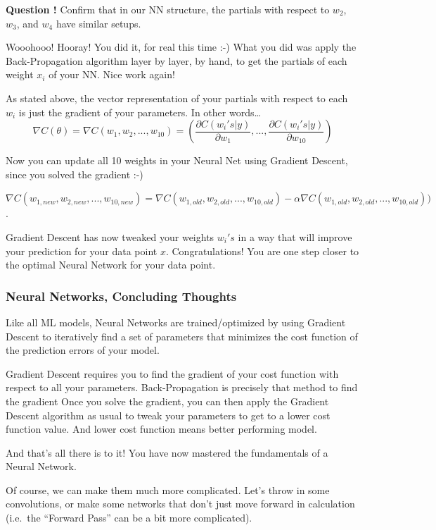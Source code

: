 \documentclass[
]{article}
\begin{document}
\textbf{Question !} Confirm that in our NN structure, the partials with
respect to \(w_2\), \(w_3\), and \(w_4\) have similar setups.

Wooohooo! Hooray! You did it, for real this time :-) What you did was
apply the Back-Propagation algorithm layer by layer, by hand, to get the
partials of each weight \(x_i\) of your NN. Nice work again!

As stated above, the vector representation of your partials with respect
to each \(w_i\) is just the gradient of your parameters. In other
words\ldots{} \[
\nabla C(\theta) = \nabla C(w_{1}, w_{2},..., w_{10}) = (\frac{\partial C(w_i's|y)}{\partial w_1}, ..., \frac{\partial C(w_i's|y)}{\partial w_{10}})
\]

Now you can update all 10 weights in your Neural Net using Gradient
Descent, since you solved the gradient :-)

\(\nabla C(w_{1,new}, w_{2,new}, ..., w_{10,new}) = \nabla C(w_{1,old}, w_{2,old}, ..., w_{10,old}) - \alpha \nabla C(w_{1,old}, w_{2,old}, ..., w_{10,old}))\).

Gradient Descent has now tweaked your weights \(w_i's\) in a way that
will improve your prediction for your data point \(x\). Congratulations!
You are one step closer to the optimal Neural Network for your data
point.

\hypertarget{neural-networks-concluding-thoughts}{%
\subsubsection{Neural Networks, Concluding
Thoughts}\label{neural-networks-concluding-thoughts}}

Like all ML models, Neural Networks are trained/optimized by using
Gradient Descent to iteratively find a set of parameters that minimizes
the cost function of the prediction errors of your model.

Gradient Descent requires you to find the gradient of your cost function
with respect to all your parameters. Back-Propagation is precisely that
method to find the gradient Once you solve the gradient, you can then
apply the Gradient Descent algorithm as usual to tweak your parameters
to get to a lower cost function value. And lower cost function means
better performing model.

And that's all there is to it! You have now mastered the fundamentals of
a Neural Network.

Of course, we can make them much more complicated. Let's throw in some
convolutions, or make some networks that don't just move forward in
calculation (i.e.~the ``Forward Pass'' can be a bit more complicated).
\end{document}
